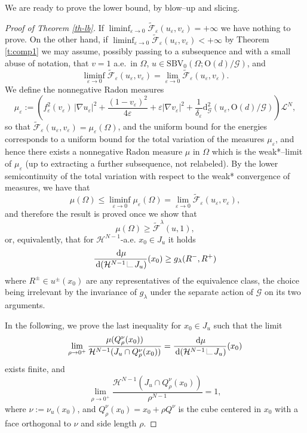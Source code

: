 \documentclass[a4paper,reqno]{amsart}
\newcommand{\dG}{\mathrm{d}_{\G}}
\newcommand\calH{\mathcal{H}}
\newcommand\di{{\,\mathrm{d}}}
\newcommand{\LM}[1]{\hbox{\vrule width.2pt \vbox to#1pt{\vfill \hrule width#1pt height.2pt}}}
\newcommand{\LL}{{\mathchoice
{\,\LM7\,}{\,\LM7\,}{\,\LM5\,}{\,\LM{3.35}\,}}}
\theoremstyle{remark}
\def\e{\varepsilon}
\newcommand{\F}{\mathcal{F}}
\newcommand{\G}{\mathcal{G}}
\newcommand{\tF}{\widetilde{\F}}
\newcommand{\On}{\mathrm{O}(d)}
\newcommand{\PC}{\mathrm{SBV}_0}
\newcommand\uu{{u}}
\numberwithin{equation}{section}
\begin{document}
We are ready to prove the lower bound, by blow--up and  slicing.

\begin{proof}[Proof of Theorem \ref{th-lb}]
	If $ \liminf_{\varepsilon\to 0} \tF_\varepsilon(\uu_\e, v_\e)=+\infty$ we have nothing to prove.
	On the other hand, if
$ \liminf_{\varepsilon\to 0} \tF_\varepsilon(\uu_\e, v_\e)<+\infty$
	by Theorem \ref{t:comp1} we may assume, possibly passing to a subsequence and with a small abuse of notation, that $v=1$ a.e.\ in $\Omega$, $\uu \in \PC(\Omega;\On/\G)$, and
	\[
	\liminf_{\varepsilon\to 0} \tF_\varepsilon(\uu_\e, v_\e)= \lim_{\varepsilon\to 0} \tF_\varepsilon(\uu_\e, v_\e).
	\]
	We define the nonnegative Radon measures
	\begin{equation}\label{2002242111}
		\mu_\varepsilon:=\left( f_\varepsilon^2(v_\varepsilon) \,|\nabla \uu_\e|^2 + \frac{(1-v_\varepsilon)^2}{4\varepsilon}+\varepsilon |\nabla v_\varepsilon|^2 + \frac{1}{\delta_\varepsilon} \dG^2(\uu_\varepsilon, \On/\G) \right) \mathcal{L}^N ,
	\end{equation}
	so that $\tF_\varepsilon(\uu_\e, v_\varepsilon)=\mu_\varepsilon(\Omega)$, and the uniform bound for the energies corresponds to a uniform bound for the total variation of the measures $\mu_\e$,   and hence there exists a nonnegative Radon measure $\mu$ in $\Omega$ which is the weak*--limit of $\mu_\e$ (up to extracting a further subsequence, not relabeled). By the lower semicontinuity of the  total variation with respect to the weak* convergence of measures, we have that
	\[
	\mu(\Omega)\leq \liminf_{\varepsilon\to 0} \mu_\e (\Omega)= \lim_{\varepsilon\to 0} \tF_\varepsilon(\uu_\e, v_\varepsilon),
	\]
	and therefore the result is proved once we show that
	\begin{equation}\label{f:lob}
		\mu(\Omega) \geq	\tF^\lambda(\uu,1) ,
	\end{equation}
	or, equivalently, that for $\calH^{N-1}$-a.e. $x_0\in J_u$ it holds
	\begin{equation}\label{f:lob2}
		\frac{\di\mu}{\di(\calH^{N-1}\LL J_u)}(x_0) \geq g_\lambda (R^-,R^+)
	\end{equation}
where $R^\pm\in u^\pm(x_0)$ are any representatives of the equivalence class, the choice being irrelevant by the invariance of $g_\lambda$ under the separate action of $\G$ on its two arguments.
	
	In the following, we  prove the last inequality for $x_0\in J_u$ such that the limit
	\begin{equation}\label{f:goodp1}
	\lim_{\rho \to 0^+} \frac{\mu(Q^\nu_\rho(x_0))}{\calH^{N-1}(J_u \cap  Q^\nu_\rho(x_0))}=	\frac{\di\mu}{\di(\calH^{N-1}\LL J_u)}(x_0)
	\end{equation}
	exists finite, and
	\begin{equation}\label{f:goodp2}
		\lim_{\rho \to 0^+} \frac{\calH^{N-1}(J_u \cap  Q^\nu_\rho(x_0))} {\rho^{N-1}}=1,
	\end{equation}
	where $\nu:=\nu_u(x_0)$, and $Q^\nu_\rho(x_0)=x_0+\rho Q^\nu$ is the cube centered in $x_0$ with a face orthogonal to $\nu$ and side length  $\rho$.
	

\end{proof}
\end{document}
